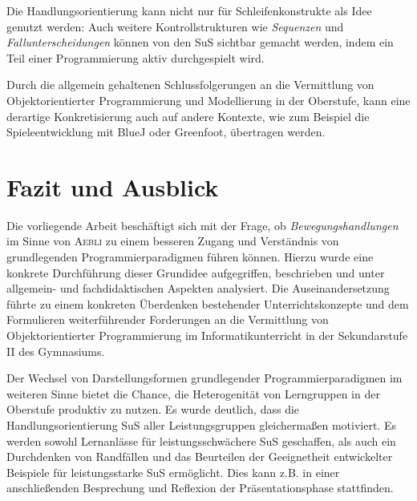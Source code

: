 \documentclass[paper=a4, DIV=13, BCOR=8mm, oneside=on, onecolumn=on, open = any, titlepage =on, parskip =half-, headsepline = on, footsepline = off, chapterprefix = on, sectionprefix = on, appendixprefix = off, fontsize = 12pt, numbers = noenddot, abstract = off]{scrreprt}
\begin{document}
Die Handlungsorientierung kann nicht nur für Schleifenkonstrukte als Idee genutzt werden: Auch weitere Kontrollstrukturen wie \emph{Sequenzen} und  \emph{Fallunterscheidungen} können von den SuS sichtbar gemacht werden, indem ein Teil einer Programmierung aktiv durchgespielt wird.


Durch die allgemein gehaltenen Schlussfolgerungen an die Vermittlung von Objektorientierter Programmierung und Modellierung in der Oberstufe, kann eine derartige Konkretisierung auch auf andere Kontexte, wie zum Beispiel die Spieleentwicklung mit BlueJ oder Greenfoot, übertragen werden.




\newpage
\chapter{Fazit und Ausblick}
\onehalfspacing
\vspace*{-1cm}

Die vorliegende Arbeit beschäftigt sich mit der Frage, ob \emph{Bewegungshandlungen} im Sinne von \textsc{Aebli} zu einem besseren Zugang und Verständnis von grundlegenden Programmierparadigmen führen können. Hierzu wurde eine konkrete Durchführung dieser Grundidee aufgegriffen, beschrieben und unter allgemein- und fachdidaktischen Aspekten analysiert. Die Auseinandersetzung führte zu einem konkreten Überdenken bestehender Unterrichtskonzepte und dem Formulieren weiterführender Forderungen an die Vermittlung von Objektorientierter Programmierung im Informatikunterricht in der Sekundarstufe II des Gymnasiums.

Der Wechsel von Darstellungsformen grundlegender Programmierparadigmen im weiteren Sinne bietet die Chance, die Heterogenität von Lerngruppen in der Oberstufe produktiv zu nutzen. Es wurde deutlich, dass die Handlungsorientierung SuS aller Leistungsgruppen gleichermaßen motiviert. Es werden sowohl Lernanlässe für leistungsschwächere SuS geschaffen, als auch ein Durchdenken von Randfällen und das Beurteilen der Geeignetheit entwickelter Beispiele für leistungsstarke SuS ermöglicht. Dies kann z.B. in einer anschließenden Besprechung und Reflexion der Präsentationsphase stattfinden. 
\end{document}
